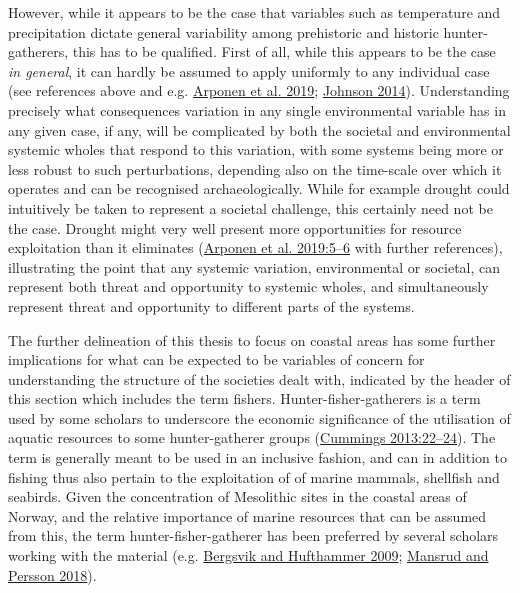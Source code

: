 \documentclass[
  12pt,
  a4paper,
  oneside]{book}
\begin{document}
However, while it appears to be the case that variables such as temperature and precipitation dictate general variability among prehistoric and historic hunter-gatherers, this has to be qualified. First of all, while this appears to be the case \emph{in general}, it can hardly be assumed to apply uniformly to any individual case (see references above and e.g. \protect\hyperlink{ref-arponen2019}{Arponen et al. 2019}; \protect\hyperlink{ref-johnson2014}{Johnson 2014}). Understanding precisely what consequences variation in any single environmental variable has in any given case, if any, will be complicated by both the societal and environmental systemic wholes that respond to this variation, with some systems being more or less robust to such perturbations, depending also on the time-scale over which it operates and can be recognised archaeologically. While for example drought could intuitively be taken to represent a societal challenge, this certainly need not be the case. Drought might very well present more opportunities for resource exploitation than it eliminates (\protect\hyperlink{ref-arponen2019}{Arponen et al. 2019:5--6} with further references), illustrating the point that any systemic variation, environmental or societal, can represent both threat and opportunity to systemic wholes, and simultaneously represent threat and opportunity to different parts of the systems.

The further delineation of this thesis to focus on coastal areas has some further implications for what can be expected to be variables of concern for understanding the structure of the societies dealt with, indicated by the header of this section which includes the term \textquotesingle fishers\textquotesingle. Hunter-fisher-gatherers
is a term used by some scholars to underscore the economic significance of the utilisation of aquatic resources to some hunter-gatherer groups (\protect\hyperlink{ref-cummings2013}{Cummings 2013:22--24}). The term is generally meant to be used in an inclusive fashion, and can in addition to fishing thus also pertain to the exploitation of of marine mammals, shellfish and seabirds. Given the concentration of Mesolithic sites in the coastal areas of Norway, and the relative importance of marine resources that can be assumed from this, the term hunter-fisher-gatherer has been preferred by several scholars working with the material (e.g. \protect\hyperlink{ref-bergsvik2009b}{Bergsvik and Hufthammer 2009}; \protect\hyperlink{ref-mansrud2018}{Mansrud and Persson 2018}).
\end{document}
